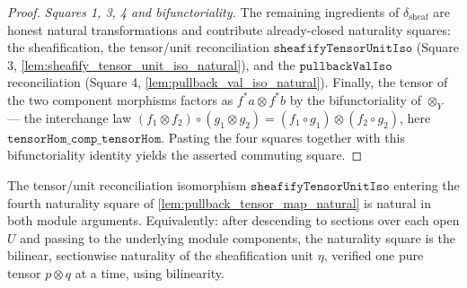 \begin{proof}
  \emph{Squares 1, 3, 4 and bifunctoriality.} The remaining ingredients of
  \(\delta_{\mathrm{sheaf}}\) are honest natural transformations and contribute already-closed
  naturality squares: the sheafification, the tensor/unit reconciliation
  \(\mathtt{sheafifyTensorUnitIso}\) (Square 3, \cref{lem:sheafify_tensor_unit_iso_natural}),
  and the \(\mathtt{pullbackValIso}\) reconciliation (Square 4,
  \cref{lem:pullback_val_iso_natural}). Finally, the tensor of the two component morphisms
  factors as \(f^*a \otimes f^*b\) by the bifunctoriality of \(\otimes_Y\) --- the interchange
  law \((f_1 \otimes f_2) \circ (g_1 \otimes g_2) = (f_1 \circ g_1) \otimes (f_2 \circ g_2)\),
  here \(\mathtt{tensorHom\_comp\_tensorHom}\). Pasting the four squares together with this
  bifunctoriality identity yields the asserted commuting square.
\end{proof}

\begin{lemma}


  \label{lem:sheafify_tensor_unit_iso_natural}
  The tensor/unit reconciliation isomorphism \(\mathtt{sheafifyTensorUnitIso}\) entering the
  fourth naturality square of \cref{lem:pullback_tensor_map_natural} is natural in both
  module arguments. Equivalently: after descending to sections over each open \(U\) and
  passing to the underlying module components, the naturality square is the
  bilinear, sectionwise naturality of the sheafification unit \(\eta\), verified one pure
  tensor \(p \otimes q\) at a time, using bilinearity.
\end{lemma}

